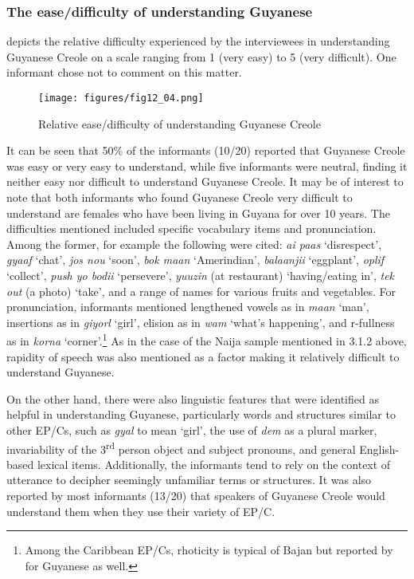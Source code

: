 \documentclass[output=paper,colorlinks,citecolor=brown]{langscibook}
\begin{document}
\subsubsection{The ease/difficulty of understanding Guyanese}

 depicts the relative difficulty experienced by the interviewees in understanding Guyanese Creole on a scale ranging from 1 (very easy) to 5 (very difficult). One informant chose not to comment on this matter.

\begin{figure}
    \texttt{[image: figures/fig12\_04.png]}
    \caption{Relative ease/difficulty of understanding Guyanese Creole}
    \label{fig:fig12_04}
\end{figure}

It can be seen that 50\% of the informants (10/20) reported that Guyanese Creole was easy or very easy to understand, while five informants were neutral, finding it neither easy nor difficult to understand Guyanese Creole. It may be of interest to note that both informants who found Guyanese Creole very difficult to understand are females who have been living in Guyana for over 10 years. The difficulties mentioned included specific vocabulary items and pronunciation. Among the former, for example the following were cited:  \emph{ai paas} ‘disrespect’, \emph{gyaaf}  ‘chat’,  \emph{jos nou} ‘soon’, \emph{bok maan} ‘Amerindian’, \emph{balaanjii} ‘eggplant’, \emph{oplif} ‘collect’, \emph{push yo bodii} ‘persevere’, \emph{yuuzin} (at restaurant) ‘having/eating in’,  \emph{tek out} (a photo) ‘take’, and a range of names for various fruits and vegetables. For pronunciation, informants mentioned lengthened vowels as in \emph{maan} ‘man’, insertions as in \emph{giyorl} ‘girl’, elision as in \emph{wam} ‘what’s happening’, and r-fullness as in \emph{korna} ‘corner’.\footnote{Among the Caribbean EP/Cs, rhoticity is typical of Bajan but reported by \citet[570]{Wells_1982} for Guyanese as well.}  As in the case of the Naija sample mentioned in 3.1.2 above, rapidity of speech was also mentioned as a factor making it relatively difficult to understand Guyanese.

On the other hand, there were also linguistic features that were identified as helpful in understanding Guyanese, particularly words and structures similar to other EP/Cs, such as \emph{gyal} to mean ‘girl’, the use of \emph{dem} as a plural marker, invariability of the 3\textsuperscript{rd} person object and subject pronouns, and general English-based lexical items. Additionally, the informants tend to rely on the context of utterance to decipher seemingly unfamiliar terms or structures. It was also reported by most informants (13/20) that speakers of Guyanese Creole would understand them when they use their variety of EP/C.
\end{document}
